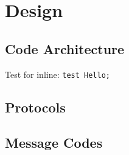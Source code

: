 \chapter{Design}

\section{Code Architecture}

Test for inline: \lstinline{test Hello;}

\section{Protocols}



\section{Message Codes}


